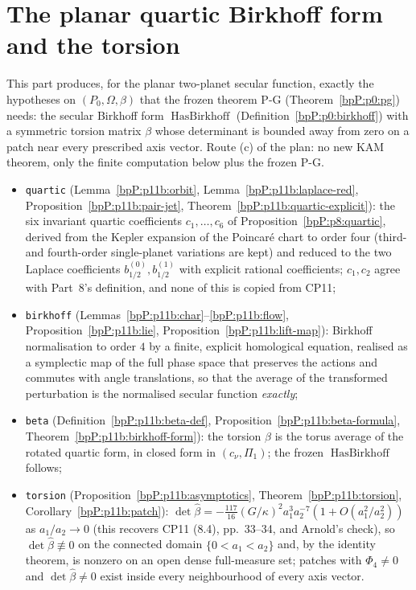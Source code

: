 \section{The planar quartic Birkhoff form and the torsion}\label{bpP:p11b}
\begingroup\sloppy

This part produces, for the planar two-planet secular function, exactly the hypotheses on $(P_0,\Omega,\beta)$ that the frozen theorem P-G (Theorem~\ref{bpP:p0:pg}) needs: the secular Birkhoff form $\operatorname{HasBirkhoff}$ (Definition~\ref{bpP:p0:birkhoff}) with a symmetric torsion matrix $\beta$ whose determinant is bounded away from zero on a patch near every prescribed axis vector. Route (c) of the plan: no new KAM theorem, only the finite computation below plus the frozen P-G.
\begin{itemize}
\item \texttt{quartic} (Lemma~\ref{bpP:p11b:orbit}, Lemma~\ref{bpP:p11b:laplace-red}, Proposition~\ref{bpP:p11b:pair-jet}, Theorem~\ref{bpP:p11b:quartic-explicit}): the six invariant quartic coefficients $c_1,\dots,c_6$ of Proposition~\ref{bpP:p8:quartic}, derived from the Kepler expansion of the Poincar\'e chart to order four (third- and fourth-order single-planet variations are kept) and reduced to the two Laplace coefficients $b_{1/2}^{(0)},b_{1/2}^{(1)}$ with explicit rational coefficients; $c_1,c_2$ agree with Part~8's definition, and none of this is copied from CP11;
\item \texttt{birkhoff} (Lemmas~\ref{bpP:p11b:char}--\ref{bpP:p11b:flow}, Proposition~\ref{bpP:p11b:lie}, Proposition~\ref{bpP:p11b:lift-map}): Birkhoff normalisation to order $4$ by a finite, explicit homological equation, realised as a symplectic map of the full phase space that preserves the actions and commutes with angle translations, so that the average of the transformed perturbation is the normalised secular function \emph{exactly};
\item \texttt{beta} (Definition~\ref{bpP:p11b:beta-def}, Proposition~\ref{bpP:p11b:beta-formula}, Theorem~\ref{bpP:p11b:birkhoff-form}): the torsion $\hat\beta$ is the torus average of the rotated quartic form, in closed form in $(c_\nu,\Pi_1)$; the frozen $\operatorname{HasBirkhoff}$ follows;
\item \texttt{torsion} (Proposition~\ref{bpP:p11b:asymptotics}, Theorem~\ref{bpP:p11b:torsion}, Corollary~\ref{bpP:p11b:patch}): $\det\hat\beta=-\tfrac{117}{16}(G/\kappa)^2a_1^3a_2^{-7}(1+O(a_1^2/a_2^2))$ as $a_1/a_2\to0$ (this recovers CP11 (8.4), pp.~33--34, and Arnold's check), so $\det\hat\beta\not\equiv0$ on the connected domain $\{0<a_1<a_2\}$ and, by the identity theorem, is nonzero on an open dense full-measure set; patches with $\Phi_4\ne0$ and $\det\hat\beta\ne0$ exist inside every neighbourhood of every axis vector.
\end{itemize}

